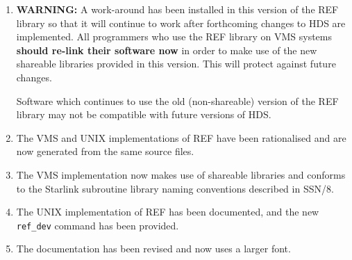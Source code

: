 \begin{enumerate}

\item
{\large \bf WARNING:} A work-around has been installed in this version of the
REF library so that it will continue to work after forthcoming changes to HDS
are implemented. All programmers who use the REF library on VMS systems {\large
\bf should re-link their software now} in order to make use of the new
shareable libraries provided in this version. This will protect against future
changes.

Software which continues to use the old (non-shareable) version of the REF
library may not be compatible with future versions of HDS.

\item
The VMS and UNIX implementations of REF have been rationalised and are now
generated from the same source files.

\item
The VMS implementation now makes use of shareable libraries and conforms to the
Starlink subroutine library naming conventions described in SSN/8.

\item
The UNIX implementation of REF has been documented, and the new {\tt ref\_dev}
command has been provided.

\item
The documentation has been revised and now uses a larger font.

\end{enumerate}


